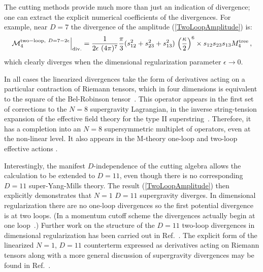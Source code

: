 \documentclass[12pt]{livrev}
\begin{document}
The cutting methods provide much more than just an indication 
of divergence; one can extract the explicit numerical coefficients
of the divergences. For example, near $D=7$ the divergence of the
amplitude (\ref{TwoLoopAmplitude}) is:
%
\begin{equation}
{\cal M}_4^{{\rm two-loop},\ D=7-2 \epsilon}\Bigr\vert_{\rm div.} = 
 {1\over 2 \epsilon\ (4\pi)^7} {\pi\over3} (s_{12}^2+s_{23}^2+s_{13}^2) \, 
\left( {\kappa \over 2}\right)^6 
\times s_{12} s_{23} s_{13} M_4^{\rm tree} \,, 
\label{gravtwolooppoles}
\end{equation}
%
which clearly diverges when the dimensional regularization parameter 
$\epsilon \rightarrow 0$.

In all cases the linearized divergences take the form of derivatives
acting on a particular contraction of Riemann tensors, which in four
dimensions is equivalent to the square of the Bel-Robinson
tensor~\cite{Bel,Deser99BelRobinsonA,Deser99BelRobinsonB}.  This
operator appears in the first set of corrections to the $N=8$
supergravity Lagrangian, in the inverse string-tension expansion of
the effective field theory for the type II
superstring~\cite{GrossWitten}.  Therefore, it has a completion
into an $N=8$ supersymmetric multiplet of operators, even at the
non-linear level.  It also appears in the M-theory one-loop and
two-loop effective actions \cite{StringR4,Tseytlin,GreenTwoLoop}.

Interestingly, the manifest $D$-independence of the cutting algebra
allows the calculation to be extended to $D=11$, even though there is
no corresponding $D=11$ super-Yang-Mills theory. The result
(\ref{TwoLoopAmplitude}) then explicitly demonstrates that $N=1$
$D=11$ supergravity diverges.  In dimensional regularization there are
no one-loop divergences so the first potential divergence is at two
loops.  (In a momentum cutoff scheme the divergences actually begin at
one loop~\cite{Tseytlin}.)  Further work on the structure of the
$D=11$ two-loop divergences in dimensional regularization has been
carried out in Ref.~\cite{DeserSeminara99,DeserSeminara00}.  The
explicit form of the linearized $N=1$, $D=11$ counterterm expressed as
derivatives acting on Riemann tensors along with a more general
discussion of supergravity divergences may be found in
Ref.~\cite{Bern00Counterterms}.
\end{document}
